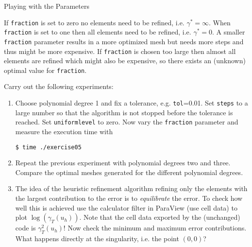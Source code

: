 \documentclass[12pt,a4paper]{article}
\begin{document}
\begin{Exercise}{Playing with the Parameters}
\begin{itemize}
    If \lstinline{fraction} is set to zero no elements need to be
    refined, i.e. $\gamma^\ast=\infty$.  When \lstinline{fraction} is
    set to one then all elements need to be refined,
    i.e. $\gamma^\ast=0$.  A smaller \lstinline{fraction} parameter
    results in a more optimized mesh but needs more steps and thus
    might be more expensive. If \lstinline{fraction} is chosen too
    large then almost all elements are refined which might also be
    expensive, so there exists an (unknown) optimal value for
    \lstinline{fraction}.
  \end{itemize}
  Carry out the following experiments:
  \begin{enumerate}
  \item Choose polynomial degree 1 and fix a tolerance,
    e.g. \lstinline{tol}=0.01.  Set \lstinline{steps} to a large
    number so that the algorithm is not stopped before the tolerance
    is reached. Set \lstinline{uniformlevel} to zero. Now vary the
    \lstinline{fraction} parameter and measure the execution time with
    \begin{lstlisting}[basicstyle=\ttfamily\small,
      frame=single,
      backgroundcolor=\color{listingbg}]
$ time ./exercise05
    \end{lstlisting}%
  \item Repeat the previous experiment with polynomial degrees two and
    three. Compare the optimal meshes generated for the different
    polynomial degrees.
  \item The idea of the heuristic refinement algorithm refining only
    the elements with the largest contribution to the error is to
    \textit{equilibrate} the error. To check how well this is achieved
    use the calculator filter in ParaView (use cell data) to plot
    $\log(\gamma_T(u_h))$. Note that the cell data exported by the
    (unchanged) code is $\gamma_T^2(u_h)$! Now check the minimum and
    maximum error contributions. What happens directly at the
    singularity, i.e. the point $(0,0)$?
  \end{enumerate}
\end{Exercise}
\end{document}
